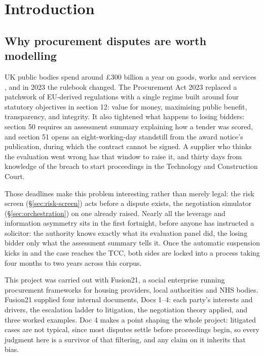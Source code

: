 \chapter{Introduction}
\label{ch:intro}

\section{Why procurement disputes are worth modelling}
\label{sec:context}

UK public bodies spend around \pounds300 billion a year on goods, works and
services \cite{cabinetoffice2020}, and in 2023 the rulebook changed. The
Procurement Act 2023 \cite{pa2023} replaced a patchwork of EU-derived
regulations with a single regime built around four statutory objectives in
section 12: value for money, maximising public benefit, transparency, and
integrity. It also tightened what happens to losing bidders: section 50 requires an
assessment summary explaining how a tender was scored, and section 51
opens an eight-working-day standstill from the award notice's publication,
during which the contract cannot be signed. A supplier who thinks the
evaluation went wrong has that window to raise it, and thirty days from
knowledge of the breach to start proceedings in the Technology and
Construction Court.

Those deadlines make this problem interesting rather than merely legal: the
risk screen (\S\ref{sec:risk-screen}) acts before a dispute exists, the
negotiation simulator (\S\ref{sec:orchestration}) on one already raised.
Nearly all the leverage and information asymmetry sits in the first
fortnight, before anyone has instructed a solicitor: the authority knows
exactly what its evaluation panel did, the losing bidder only what the
assessment summary tells it. Once the automatic suspension kicks in and
the case reaches the TCC, both sides are locked into a process taking four
months to two years across this corpus.

This project was carried out with Fusion21, a social enterprise running
procurement frameworks for housing providers, local authorities and NHS
bodies. Fusion21 supplied four internal documents, Docs 1--4: each party's
interests and drivers, the escalation ladder to litigation, the
negotiation theory applied, and three worked examples. Doc 4 makes a point
shaping the whole project: litigated cases are not typical, since most
disputes settle before proceedings begin, so every judgment here is a
survivor of that filtering, and any claim on it inherits that bias.

